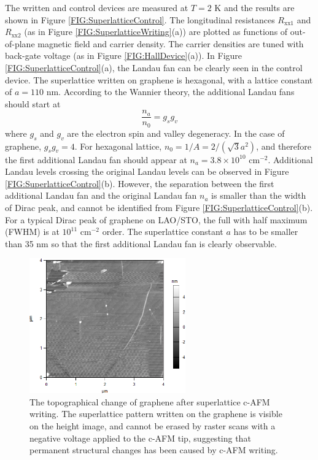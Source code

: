 \documentclass[pdflatex, sectionletters, 12pt]{pittetd}    %
\begin{document}
The written and control devices are measured at $T = 2$ K and the results are shown in Figure \ref{FIG:SuperlatticeControl}. The longitudinal resistances $R_\mathrm{xx1}$ and $R_\mathrm{xx2}$ (as in Figure \ref{FIG:SuperlatticeWriting}(a)) are plotted as functions of out-of-plane magnetic field and carrier density. The carrier densities are tuned with back-gate voltage (as in Figure \ref{FIG:HallDevice}(a)). In Figure \ref{FIG:SuperlatticeControl}(a), the Landau fan can be clearly seen in the control device. The superlattice written on graphene is hexagonal, with a lattice constant of $a = 110$ nm. According to the Wannier theory, the additional Landau fans should start at\cite{dean2013hofstadter} 
$$
\frac{n_a}{n_0} = g_s g_v
$$
where $g_s$ and $g_v$ are the electron spin and valley degeneracy. In the case of graphene, $g_s g_v = 4$. For hexagonal lattice, $n_0 = 1/A = 2 / (\sqrt{3} a^2)$, and therefore the first additional Landau fan should appear at $n_a = 3.8 \times 10^{10}$ cm$^{-2}$. Additional Landau levels crossing the original Landau levels can be observed in Figure \ref{FIG:SuperlatticeControl}(b). However, the separation between the first additional Landau fan and the original Landau fan $n_a$ is smaller than the width of Dirac peak, and cannot be identified from Figure \ref{FIG:SuperlatticeControl}(b). For a typical Dirac peak of graphene on LAO/STO, the full with half maximum (FWHM) is at $10^{11}$ cm$^{-2}$ order. The superlattice constant $a$ has to be smaller than 35 nm so that the first additional Landau fan is clearly observable.
\\

\begin{figure}[h!]
	\centering
	\includegraphics[width=0.6\textwidth]{Drawing/SuperlatticeDamage.png}
	\caption{The topographical change of graphene after superlattice c-AFM writing. The superlattice pattern written on the graphene is visible on the height image, and cannot be erased by raster scans with a negative voltage applied to the c-AFM tip, suggesting that permanent structural changes has been caused by c-AFM writing.}
	\label{FIG:SuperlatticeDamage}
\end{figure}
\end{document}
